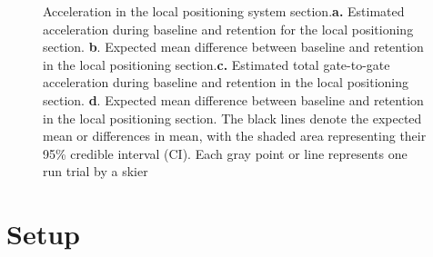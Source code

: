 \begin{figure}[H]
\caption{Acceleration in the local positioning system section.\textbf{a.} Estimated acceleration during baseline and retention for the local positioning section. \textbf{b}. Expected mean difference between baseline and retention in the local positioning section.\textbf{c.} Estimated total gate-to-gate acceleration during baseline and retention in the local positioning section. \textbf{d}. Expected mean difference between baseline and retention in the local positioning section. The black lines denote the expected mean or differences in mean, with the shaded area representing their 95\% credible interval (CI). Each gray point or line represents one run trial by a skier}\label{fig: acc}
\end{figure}


\section{Setup}

